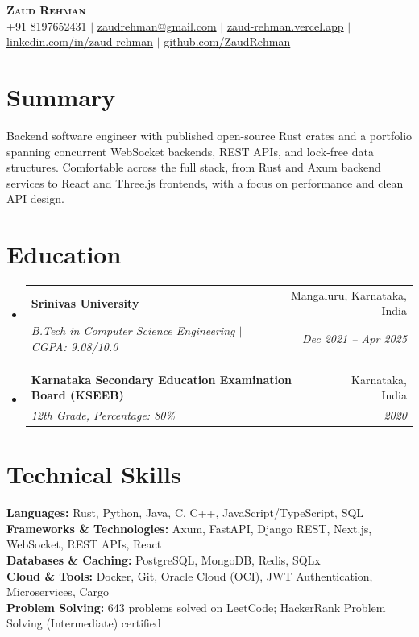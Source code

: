 \documentclass[letterpaper,10pt]{article}
\makeatletter
\newcommand{\resumeSubheading}[4]{
  \vspace{-1pt}\item
    \begin{tabular*}{0.97\textwidth}[t]{l@{\extracolsep{\fill}}r}
      \textbf{#1} & #2 \\
      \textit{\small#3} & \textit{\small #4} \\
    \end{tabular*}\vspace{-5pt}
}
\newcommand{\resumeSubHeadingListStart}{\begin{itemize}[leftmargin=0.15in, label={}]}
\newcommand{\resumeSubHeadingListEnd}{\end{itemize}}
\makeatother
\begin{document}
\begin{center}
    \textbf{\Huge \scshape Zaud Rehman} \\ \vspace{4pt}
    \small
    +91 8197652431 $|$
    \href{mailto:zaudrehman@gmail.com}{zaudrehman@gmail.com} $|$
    \href{https://zaud-rehman.vercel.app}{zaud-rehman.vercel.app} $|$
    \href{https://linkedin.com/in/zaud-rehman-31514a288}{linkedin.com/in/zaud-rehman} $|$
    \href{https://github.com/ZaudRehman}{github.com/ZaudRehman}
\end{center}

\section{Summary}
\vspace{1pt}
\small{Backend software engineer with published open-source Rust crates and a portfolio spanning concurrent WebSocket backends, REST APIs, and lock-free data structures. Comfortable across the full stack, from Rust and Axum backend services to React and Three.js frontends, with a focus on performance and clean API design. }

\section{Education}
\vspace{1pt}
\resumeSubHeadingListStart
    \resumeSubheading
        {Srinivas University}{Mangaluru, Karnataka, India}
        {B.Tech in Computer Science Engineering $|$ CGPA: 9.08/10.0}{Dec 2021 -- Apr 2025}
        \vspace{4pt}

    \resumeSubheading
        {Karnataka Secondary Education Examination Board (KSEEB)}{Karnataka, India}
        {12th Grade, Percentage: 80\%}{2020}
\resumeSubHeadingListEnd
\vspace{1pt}

\section{Technical Skills}
\begin{itemize}[leftmargin=0.15in, label={}]
    \small{\item{
        \textbf{Languages:}{ Rust, Python, Java, C, C++, JavaScript/TypeScript, SQL} \\
        \textbf{Frameworks \& Technologies:}{ Axum, FastAPI, Django REST, Next.js, WebSocket, REST APIs, React} \\
        \textbf{Databases \& Caching:}{ PostgreSQL, MongoDB, Redis, SQLx} \\
        \textbf{Cloud \& Tools:}{ Docker, Git, Oracle Cloud (OCI), JWT Authentication, Microservices, Cargo} \\
        \textbf{Problem Solving:}{ 643 problems solved on LeetCode; HackerRank Problem Solving (Intermediate) certified}
    }}
\end{itemize}
\end{document}
